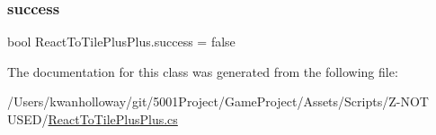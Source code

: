 \subsubsection{\texorpdfstring{success}{success}}
{\footnotesize\ttfamily bool React\+To\+Tile\+Plus\+Plus.\+success = false}



The documentation for this class was generated from the following file\+:\begin{DoxyCompactItemize}
\item 
/\+Users/kwanholloway/git/5001\+Project/\+Game\+Project/\+Assets/\+Scripts/\+Z-\/\+N\+O\+T U\+S\+E\+D/\hyperlink{_react_to_tile_plus_plus_8cs}{React\+To\+Tile\+Plus\+Plus.\+cs}\end{DoxyCompactItemize}
